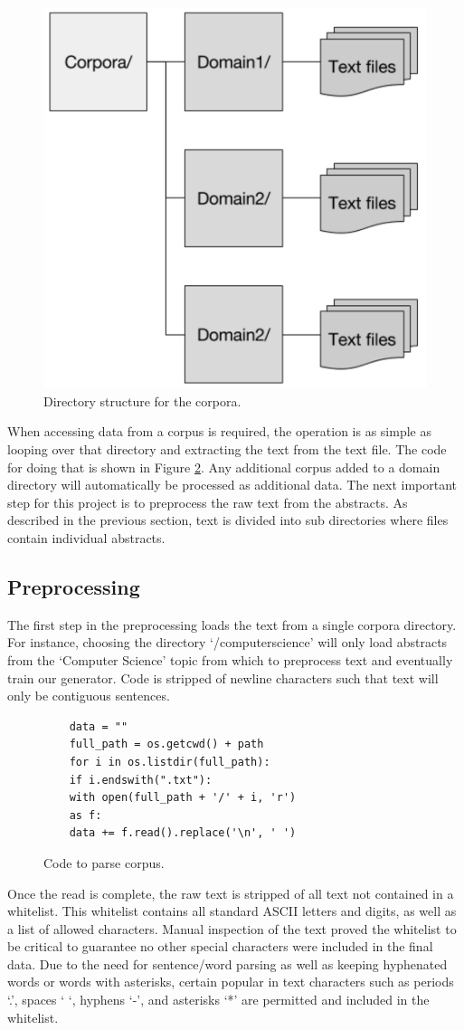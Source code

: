\documentclass[letterpaper, 10 pt, conference]{ieeeconf}  %
\begin{document}
\begin{figure}[!ht]
	\centering
	\includegraphics[width=.4\textwidth]{filestruct}
	\caption{Directory structure for the corpora.}
	\label{fig:Directorystructure}
\end{figure}

When accessing data from a corpus is required, the operation is as simple as looping over that directory and extracting the text from the text file. The code for doing that is shown in Figure \ref{fig:Codeparse}.  Any additional corpus added to a domain directory will automatically be processed as additional data. The next important step for this project is to preprocess the raw text from the abstracts. As described in the previous section, text is divided into sub directories where files contain individual abstracts. 

\subsection{Preprocessing}

The first step in the preprocessing loads the text from a single corpora directory. For instance, choosing the directory ‘/computerscience’ will only load abstracts from the ‘Computer Science’ topic from which to preprocess text and eventually train our generator. Code is stripped of newline characters such that text will only be contiguous sentences.

\begin{figure}[!ht]
	\begin{verbatim}
	data = ""
	full_path = os.getcwd() + path
	for i in os.listdir(full_path):
	if i.endswith(".txt"):
	with open(full_path + '/' + i, 'r') 
	as f:
	data += f.read().replace('\n', ' ')
	\end{verbatim}
	
	\caption{Code to parse corpus.}
	\label{fig:Codeparse}
\end{figure}

Once the read is complete, the raw text is stripped of all text not contained in a whitelist. This whitelist contains all standard ASCII letters and digits, as well as a list of allowed characters. Manual inspection of the text proved the whitelist to be critical to guarantee no other special characters were included in the final data. Due to the need for sentence/word parsing as well as keeping hyphenated words or words with asterisks, certain popular in text characters such as periods ‘.’, spaces ‘ ‘, hyphens ‘-’, and asterisks ‘*’ are permitted and included in the whitelist. 
\end{document}
